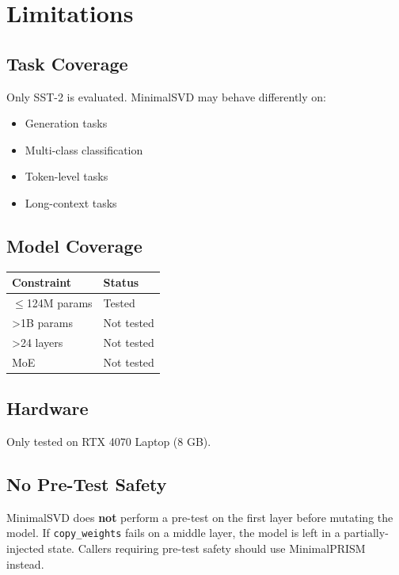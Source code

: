 
\section{Limitations}

\subsection{Task Coverage}

Only SST-2 is evaluated. MinimalSVD may behave differently on:
\begin{itemize}
\item Generation tasks
\item Multi-class classification
\item Token-level tasks
\item Long-context tasks

\end{itemize}
\subsection{Model Coverage}

\begin{table}[H]
\centering
\small
\begin{tabular}{ll}
\toprule
\textbf{Constraint} & \textbf{Status} \\
\midrule
$\le$124M params & Tested \\
\textgreater{}1B params & Not tested \\
\textgreater{}24 layers & Not tested \\
MoE & Not tested \\
\bottomrule
\end{tabular}
\end{table}

\subsection{Hardware}

Only tested on RTX 4070 Laptop (8 GB).

\subsection{No Pre-Test Safety}

MinimalSVD does \textbf{not} perform a pre-test on the first layer before mutating 
the model. If \texttt{copy\_weights} fails on a middle layer, the model is left in a 
partially-injected state. Callers requiring pre-test safety should use 
MinimalPRISM instead.

